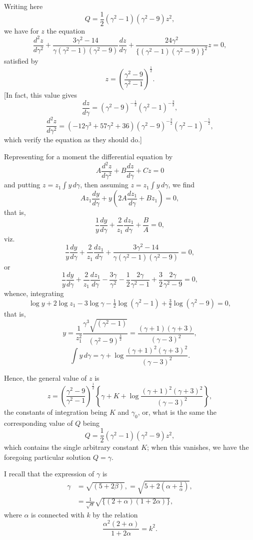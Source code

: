 \documentclass[11pt,a4paper]{article}
\begin{document}
\newpage
\noindent Writing here
\[
Q = \frac{1}{2}(\gamma^2-1)(\gamma^2-9)z^2,
\]
we have for $z$ the equation
\[
\frac{d^2z}{d\gamma^2}
  + \frac{3\gamma^2-14}{\gamma(\gamma^2-1)(\gamma^2-9)}\frac{dz}{d\gamma}
  + \frac{24\gamma^2}{\{(\gamma^2-1)(\gamma^2-9)\}^2}z = 0,
\]
satisfied by
\[
z = \left(\frac{\gamma^2-9}{\gamma^2-1}\right)^{\frac{1}{2}}.
\]
[In fact, this value gives
\[
\frac{dz}{d\gamma} = (\gamma^2-9)^{-\frac{1}{2}}(\gamma^2-1)^{-\frac{3}{2}},
\]
\[
\frac{d^2z}{d\gamma^2}
  = (-12\gamma^3+57\gamma^2+36)
    (\gamma^2-9)^{-\frac{3}{2}}(\gamma^2-1)^{-\frac{5}{2}},
\]
which verify the equation as they should do.]

Representing for a moment the differential equation by
\[A\frac{d^2z}{d\gamma^2} + B\frac{dz}{d\gamma} + Cz = 0\]
and putting $z=z_1\int y\,d\gamma$, then assuming $z=z_1\int y\,d\gamma$, we find
\[
Az_1\frac{dy}{d\gamma}
  + y\left(2A\frac{dz_1}{d\gamma}+Bz_1\right) = 0,
\]
that is,
\[
\frac{1}{y}\frac{dy}{d\gamma}
  + \frac{2}{z_1}\frac{dz_1}{d\gamma} + \frac{B}{A} = 0,
\]
viz.
\[
\frac{1}{y}\frac{dy}{d\gamma}
  + \frac{2}{z_1}\frac{dz_1}{d\gamma}
  + \frac{3\gamma^2-14}{\gamma(\gamma^2-1)(\gamma^2-9)} = 0,
\]
or
\[
\frac{1}{y}\frac{dy}{d\gamma}
  + \frac{2}{z_1}\frac{dz_1}{d\gamma}
  - \frac{3\gamma}{\gamma^2}
  - \frac{1}{2}\frac{2\gamma}{\gamma^2-1}
  + \frac{3}{2}\frac{2\gamma}{\gamma^2-9} = 0,
\]
whence, integrating
\[
\log y + 2\log z_1 - 3\log\gamma - \tfrac{1}{2}\log(\gamma^2-1)
  + \tfrac{3}{2}\log(\gamma^2-9) = 0,
\]
that is,
\[
y = \frac{1}{z_1^2}
    \frac{\gamma^3\sqrt{(\gamma^2-1)}}{(\gamma^2-9)^{\frac{3}{2}}}
  = \frac{(\gamma+1)(\gamma+3)}{(\gamma-3)^2},
\]
\[
\int y\,d\gamma
  = \gamma + \log\frac{(\gamma+1)^2(\gamma+3)^2}{(\gamma-3)^2}.
\]

\newpage
Hence, the general value of $z$ is
\[
z = \left(\frac{\gamma^2-9}{\gamma^2-1}\right)^{\frac{1}{2}}
    \left\{
      \gamma + K + \log\frac{(\gamma+1)^2(\gamma+3)^2}{(\gamma-3)^2}
    \right\},
\]
the constants of integration being $K$ and $\gamma_0$, or, what is the same
the corresponding value of $Q$ being
\[
Q = \frac{1}{2}(\gamma^2-1)(\gamma^2-9)z^2,
\]
which contains the single arbitrary constant $K$; when this vanishes, we have
the foregoing particular solution $Q=\gamma$.

I recall that the expression of $\gamma$ is
\begin{align*}
\gamma &= \sqrt{(5+2\beta)},
       = \sqrt{5+2\left(\alpha+\frac{1}{\alpha}\right)},\\
     &= \frac{1}{\sqrt{\alpha}}\sqrt{\{(2+\alpha)(1+2\alpha)\}},
\end{align*}
where $\alpha$ is connected with $k$ by the relation
\[
\frac{\alpha^2(2+\alpha)}{1+2\alpha} = k^2.
\]
\end{document}
